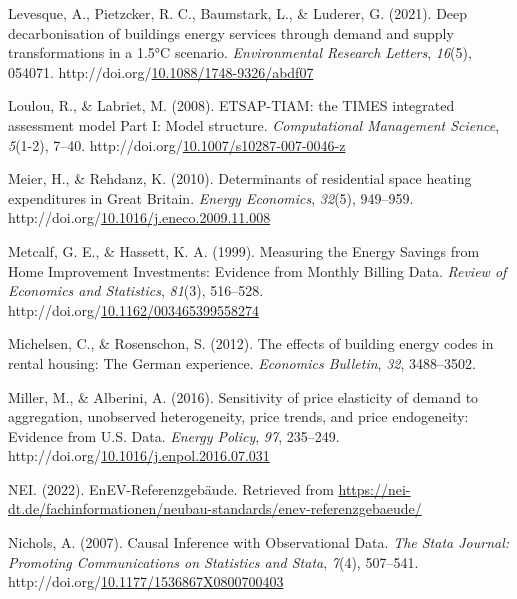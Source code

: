 \documentclass[12pt,twoside]{reedthesis}
\newlength{\cslhangindent}
\newenvironment{CSLReferences}[2] %
 {%
  \setlength{\parindent}{0pt}
  \ifodd #1 \everypar{\setlength{\hangindent}{\cslhangindent}}\ignorespaces\fi
  \ifnum #2 > 0
  \setlength{\parskip}{#2\baselineskip}
  \fi
 }%
 {}
\begin{document}
\begin{CSLReferences}{1}{0}
\leavevmode{}%
Levesque, A., Pietzcker, R. C., Baumstark, L., \& Luderer, G. (2021). Deep decarbonisation of buildings energy services through demand and supply transformations in a 1.5°C scenario. \emph{Environmental Research Letters}, \emph{16}(5), 054071. http://doi.org/\href{https://doi.org/10.1088/1748-9326/abdf07}{10.1088/1748-9326/abdf07}

\leavevmode{}%
Loulou, R., \& Labriet, M. (2008). ETSAP-TIAM: the TIMES integrated assessment model Part I: Model structure. \emph{Computational Management Science}, \emph{5}(1-2), 7--40. http://doi.org/\href{https://doi.org/10.1007/s10287-007-0046-z}{10.1007/s10287-007-0046-z}

\leavevmode{}%
Meier, H., \& Rehdanz, K. (2010). Determinants of residential space heating expenditures in Great Britain. \emph{Energy Economics}, \emph{32}(5), 949--959. http://doi.org/\href{https://doi.org/10.1016/j.eneco.2009.11.008}{10.1016/j.eneco.2009.11.008}

\leavevmode{}%
Metcalf, G. E., \& Hassett, K. A. (1999). Measuring the Energy Savings from Home Improvement Investments: Evidence from Monthly Billing Data. \emph{Review of Economics and Statistics}, \emph{81}(3), 516--528. http://doi.org/\href{https://doi.org/10.1162/003465399558274}{10.1162/003465399558274}

\leavevmode{}%
Michelsen, C., \& Rosenschon, S. (2012). The effects of building energy codes in rental housing: The German experience. \emph{Economics Bulletin}, \emph{32}, 3488--3502.

\leavevmode{}%
Miller, M., \& Alberini, A. (2016). Sensitivity of price elasticity of demand to aggregation, unobserved heterogeneity, price trends, and price endogeneity: Evidence from U.S. Data. \emph{Energy Policy}, \emph{97}, 235--249. http://doi.org/\href{https://doi.org/10.1016/j.enpol.2016.07.031}{10.1016/j.enpol.2016.07.031}

\leavevmode{}%
NEI. (2022). EnEV-Referenzgebäude. Retrieved from \url{https://nei-dt.de/fachinformationen/neubau-standards/enev-referenzgebaeude/}

\leavevmode{}%
Nichols, A. (2007). Causal Inference with Observational Data. \emph{The Stata Journal: Promoting Communications on Statistics and Stata}, \emph{7}(4), 507--541. http://doi.org/\href{https://doi.org/10.1177/1536867X0800700403}{10.1177/1536867X0800700403}


\end{CSLReferences}
\end{document}
